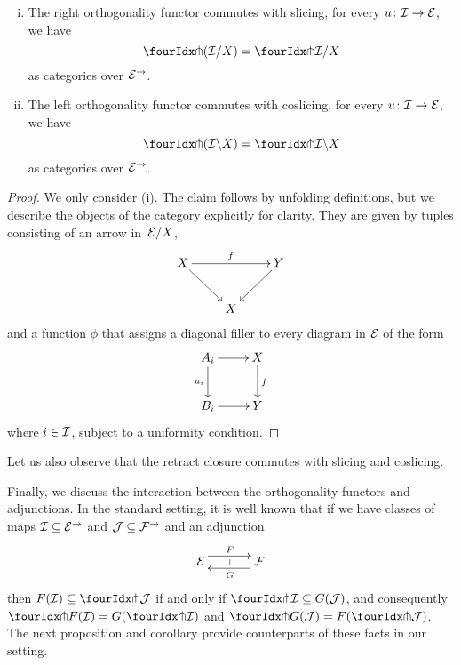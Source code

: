 \documentclass[reqno,10pt,a4paper,oneside,draft]{amsart}
\begin{document}
\begin{proposition} \label{pitchfork-slicing}
\hfill
\begin{enumerate}[(i)]
\item The right orthogonality functor commutes with slicing, \ie for every $u \co \cal{I} \to \cal{E}$, we have
\[
  \liftr{(\cal{I}/X)} = \liftr{\cal{I}}/X 
\]
as categories over $\cal{E}^\to$.
\item The left orthogonality functor commutes with coslicing, \ie for every $u \co \cal{I} \to \cal{E}$, we have
\[
  \liftl{(\cal{I} \backslash X)} = \liftl{\cal{I}} \backslash X
\]
as categories over $\cal{E}^\to$.
\end{enumerate}
\end{proposition}

\begin{proof}
We only consider (i).
The claim follows by unfolding definitions, but we describe the objects of the category explicitly for clarity.
They are given by tuples consisting of an arrow in~$\cal{E}/X$,
\[
\xymatrix{
  X \ar[dr] \ar[rr]^f  &  & Y \ar[dl] \\
  & X &
}
\]
and a function $\phi$ that assigns a diagonal filler to every diagram in $\cal{E}$ of the form
\[
\xymatrix{
  A_i \ar[r] \ar[d]_{u_i} & X \ar[d]^{f} \\
  B_i \ar[r] & Y
}
\]
where $i \in \cal{I}$, subject to a uniformity condition.
\end{proof}

Let us also observe that the retract closure commutes with slicing and coslicing. 


Finally, we discuss the interaction between the orthogonality functors and adjunctions.
In the standard setting, it is well known that if we have classes of maps $\cal{I} \subseteq \cal{E}^\to$ and $\cal{J} \subseteq \cal{F}^\to$ and an adjunction
\[
\xymatrix@C+1em{
  \cal{E}
  \ar@<5pt>[r]^{F}
  \ar@{}[r]|{\bot}
&
  \cal{F}
  \ar@<5pt>[l]^{G}
}
\]
then $F(\cal{I}) \subseteq \liftl{\cal{J}}$ if and only if $\liftr{\cal{I}} \subseteq G(\cal{J})$, and consequently $\liftr{F(\cal{I})} = G(\liftr{\cal{I}})$ and $\liftl{G(\cal{J})} = F(\liftl{\cal{J}})$.
The next proposition and corollary provide counterparts of these facts in our setting.
\end{document}
